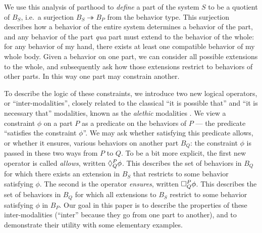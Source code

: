 We use this analysis of
parthood to \emph{define} a part of the system $S$ to be a quotient of $B_S$, i.e.\ a surjection $B_S \twoheadrightarrow B_P$ from the behavior type.
This surjection describes how a behavior of the entire system determines a behavior of the part, and any behavior of the part \emph{qua} part must extend to the behavior of the whole: for any behavior of my hand, there exists at least one compatible behavior of my whole body. Given a behavior on one part, we can consider all possible extensions to the whole, and subsequently ask how those extensions restrict to behaviors of other parts. In this way one part may constrain another.

To describe the logic of these constraints, we introduce two new logical
operators, or ``inter-modalities'', closely related to the classical ``it is
possible that'' and ``it is necessary that'' modalities, known as the
\emph{alethic} modalities \cite{kripke1963semantical}. We view a constraint
$\phi$ on a part $P$ as a predicate on the behaviors of $P$ --- the predicate
``satisfies the constraint $\phi$''. We may ask whether satisfying this
predicate allows, or whether it ensures, various behaviors on another part
$B_Q$: the constraint $\phi$ is passed in these two ways  from $P$ to $Q$.  To
be a bit more explicit, the first new operator is called \emph{allows}, written
$\allows{P}{Q}\phi$. This describes the set of behaviors in $B_Q$ for which
there exists an extension in $B_S$ that restricts to some behavior satisfying
$\phi$. The second is the operator \emph{ensures}, written $\ensure{P}{Q}\phi$.
This describes the set of behaviors in $B_Q$ for which all extensions to $B_S$
restrict to some behavior satisfying $\phi$ in $B_P$. Our goal in this paper is
to describe the properties of these inter-modalities (``inter'' because they go
from one part to another), and to demonstrate their utility with some elementary
examples.

